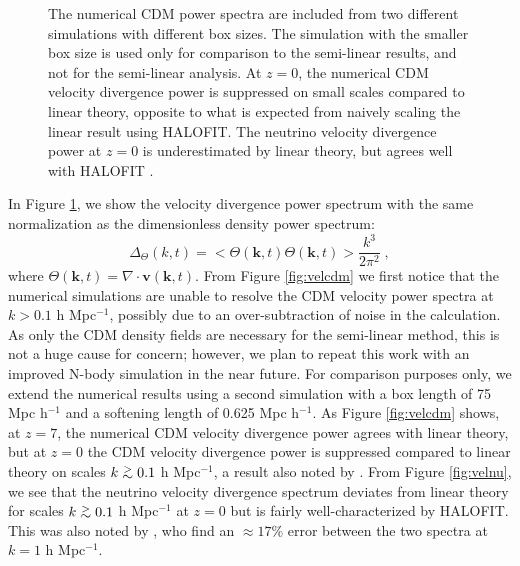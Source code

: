 \documentclass{aastex}
\def\gtsima{$\; \buildrel > \over \sim \;$}
\def\gsim{\lower.5ex\hbox{\gtsima}}
\newcommand{\halofit}{HALOFIT }
\newcommand{\halofitns}{HALOFIT}
\begin{document}
\begin{figure}[h!]
{     %
      The numerical CDM
      power spectra are included from two
      different simulations with different box sizes.  The
      simulation with the smaller box size is used only for comparison to
      the semi-linear results, and not for the semi-linear analysis.  
      At $z=0$, the
      numerical CDM velocity divergence power is
      suppressed on small scales compared to
      linear theory, opposite to what is
      expected from naively scaling the linear result using \halofitns.
      The neutrino velocity divergence power at $z=0$ is
      underestimated by linear theory, but agrees well
      with \halofit.   
}\label{fig:vel}
\end{figure}

In Figure \ref{fig:vel}, we show the velocity divergence power
spectrum with the same normalization as the dimensionless density power spectrum:
\begin{equation}
  \Delta_\Theta(k,t) = <\Theta(\mathbf{k},t) \Theta(\mathbf{k},t)>  \frac{k^3}{2 \pi^2}  \;,
\end{equation}
where $\Theta(\mathbf{k},t) = \nabla \cdot \mathbf{v}(\mathbf{k},t)
$. 
From Figure \ref{fig:velcdm} we first notice that the numerical
simulations are unable to resolve the CDM velocity power
spectra at $k > 0.1 $ h Mpc$^{-1}$, possibly due to an
over-subtraction of noise in the calculation.
As only the CDM density fields are
necessary for the semi-linear method, this is
not a huge cause for concern; however, we plan to repeat this work
with an improved N-body simulation in the near future.
For comparison purposes only, we extend the numerical results using 
a second simulation with a 
box length of 75 Mpc h$^{-1}$ and a softening length of 0.625
Mpc h$^{-1}$.  
As Figure \ref{fig:velcdm} shows, at $z=7$, the numerical CDM velocity divergence power agrees with 
linear theory, but at $z=0$ 
the CDM velocity divergence power is suppressed 
compared to linear theory on scales $k\gsim0.1$ h Mpc$^{-1}$, a result also noted by \cite{inman15}.  
From Figure \ref{fig:velnu}, we see that the neutrino velocity
divergence spectrum deviates from linear theory for scales $k \gsim
0.1$ h Mpc$^{-1}$ at $z=0$ but 
is fairly well-characterized by \halofitns.  This was also noted by \cite{inman15}, who find
an $\approx 17$\% error between the two spectra at $k=1$ h
Mpc$^{-1}$. 
\end{document}
